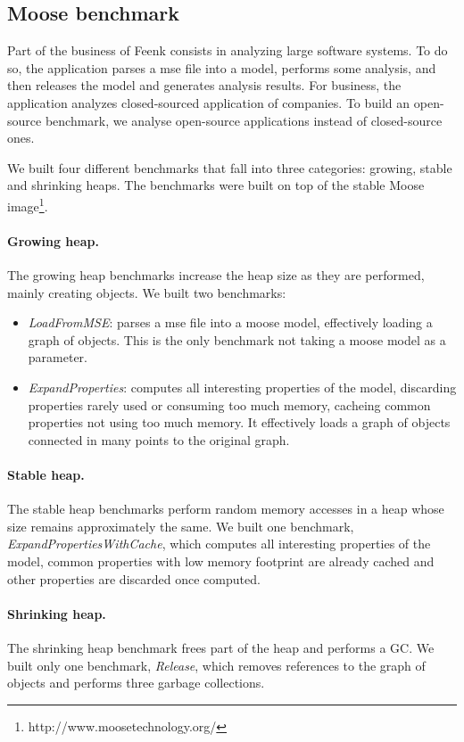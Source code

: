 \documentclass[10pt, sigplan]{acmart}
\begin{document}
\subsection{Moose benchmark} \label{sec:mooseBench}

Part of the business of Feenk consists in analyzing large software systems. To do so, the application parses a mse file into a model, performs some analysis, and then releases the model and generates analysis results. For business, the application analyzes closed-sourced application of companies. To build an open-source benchmark, we analyse open-source applications instead of closed-source ones.

We built four different benchmarks that fall into three categories: growing, stable and shrinking heaps. The benchmarks were built on top of the stable Moose image\footnote{http://www.moosetechnology.org/}.

\paragraph{Growing heap.} The growing heap benchmarks increase the heap size as they are performed, mainly creating objects. We built two benchmarks:
\begin{itemize}
	\item \emph{LoadFromMSE}: parses a mse file into a moose model, effectively loading a graph of objects. This is the only benchmark not taking a moose model as a parameter.
	\item \emph{ExpandProperties}: computes all interesting properties of the model, discarding properties rarely used or consuming too much memory, cacheing common properties not using too much memory. It effectively loads a graph of objects connected in many points to the original graph. 
\end{itemize}

\paragraph{Stable heap.} The stable heap benchmarks perform random memory accesses in a heap whose size remains approximately the same. We built one benchmark, \emph{ExpandPropertiesWithCache}, which computes all interesting properties of the model, common properties with low memory footprint are already cached and other properties are discarded once computed.

\paragraph{Shrinking heap.} The shrinking heap benchmark frees part of the heap and performs a GC. We built only one benchmark, \emph{Release}, which removes references to the graph of objects and performs three garbage collections.
\end{document}
